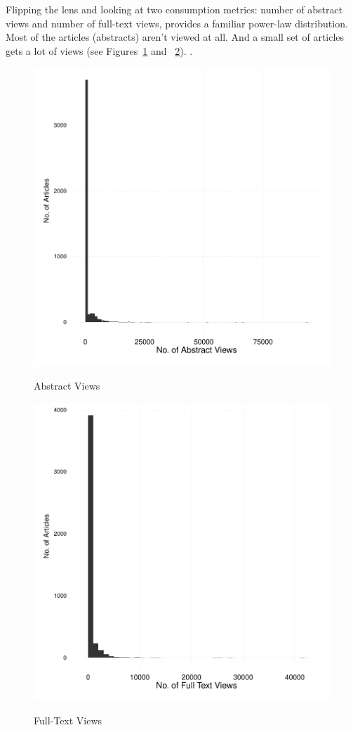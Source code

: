 \documentclass[11pt]{article}
\begin{document}
Flipping the lens and looking at two consumption metrics: number of abstract views and number of full-text views, provides a familiar power-law distribution. Most of the articles (abstracts) aren't viewed at all. And a small set of articles gets a lot of views (see Figures~\ref{fig:abstracts} and ~\ref{fig:fulltext}). .

\begin{figure}[htbp]
\centering
\caption{Abstract Views}
\includegraphics[scale=.85]{../figs/abstract_views.pdf}
\label{fig:abstracts}
\end{figure}

\begin{figure}[htbp]
\centering
\caption{Full-Text Views}
\includegraphics[scale=.85]{../figs/fulltext_views.pdf}
\label{fig:fulltext}
\end{figure}
\end{document}
